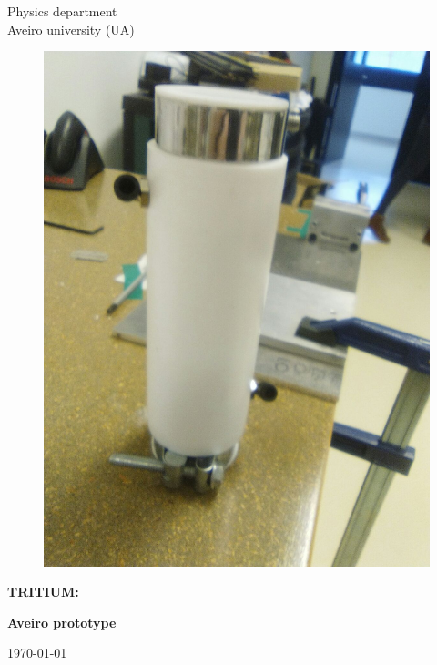 \begin{titlepage}
\begin{center}
\vspace*{1cm}
Physics department\\
Aveiro university (UA)
\vspace*{0.3in}

\begin{figure}[H]
\centering
\includegraphics[scale=0.2]{Figures/AveiroPrototype.jpeg}
\end{figure}


\begin{Large}
\textbf{TRITIUM:}\\
\end{Large}
\begin{Large}
\textbf{Aveiro prototype}\\
\end{Large}
\vspace*{0.2in}
\today 
\paragraph {}
\begin{large}


\end{large}
\end{center}
\end{titlepage}
